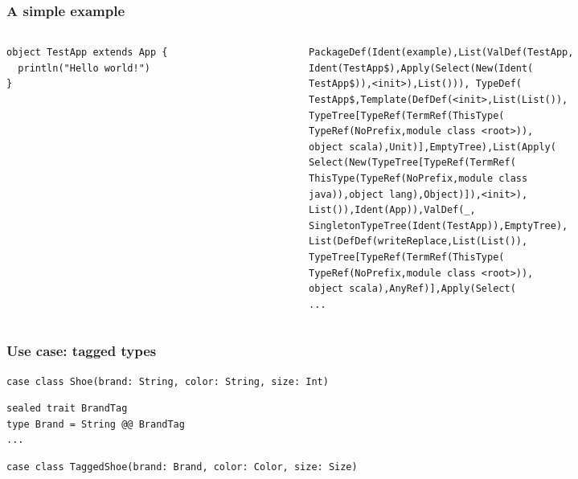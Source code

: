 \documentclass[aspectratio=169]{beamer}
\begin{document}
\begin{frame}[fragile]
\frametitle{A simple example}
\begin{columns}
\begin{column}{0.4\textwidth}
\begin{lstlisting}[style=myScalastyle,frame=none]
object TestApp extends App {
  println("Hello world!")
}
\end{lstlisting}
\end{column}
\pause
\begin{column}{0.6\textwidth}
  \begin{lstlisting}[style=myTerminal,frame=none]
PackageDef(Ident(example),List(ValDef(TestApp,
Ident(TestApp$),Apply(Select(New(Ident(
TestApp$)),<init>),List())), TypeDef(
TestApp$,Template(DefDef(<init>,List(List()),
TypeTree[TypeRef(TermRef(ThisType(
TypeRef(NoPrefix,module class <root>)),
object scala),Unit)],EmptyTree),List(Apply(
Select(New(TypeTree[TypeRef(TermRef(
ThisType(TypeRef(NoPrefix,module class
java)),object lang),Object)]),<init>),
List()),Ident(App)),ValDef(_,
SingletonTypeTree(Ident(TestApp)),EmptyTree),
List(DefDef(writeReplace,List(List()),
TypeTree[TypeRef(TermRef(ThisType(
TypeRef(NoPrefix,module class <root>)),
object scala),AnyRef)],Apply(Select(
...
\end{lstlisting}
\end{column}
\end{columns}

\end{frame}





\begin{frame}[fragile]
  \frametitle{Use case: tagged types}
  
  \begin{lstlisting}[style=myScalastyle,frame=none]
case class Shoe(brand: String, color: String, size: Int)
  \end{lstlisting}
  \pause
  \begin{lstlisting}[style=myScalastyle,frame=none]
sealed trait BrandTag
type Brand = String @@ BrandTag
...
  \end{lstlisting}
  \pause
    \begin{lstlisting}[style=myScalastyle,frame=none]
case class TaggedShoe(brand: Brand, color: Color, size: Size)
  \end{lstlisting}
\end{frame}
\end{document}
